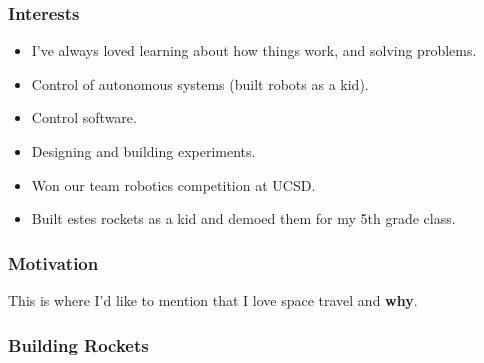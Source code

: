 \documentclass[aspectratio=169]{beamer}
\begin{document}
\begin{frame}
  \frametitle{Interests} 
  \begin{itemize}
  \item I've always loved learning about how things work,
    and solving problems.
  \item Control of autonomous systems (built robots as a kid).
  \item Control software.
  \item Designing and building experiments.
  \item Won our team robotics competition at UCSD.
  \item Built estes rockets as a kid and demoed them for my 5th grade class.
  \end{itemize}
\end{frame}

\begin{frame}
  \frametitle{Motivation}
  This is where I'd like to mention that I love
  space travel and \textbf{why}.
  
  
\end{frame}

\begin{frame}
  \frametitle{Building Rockets}
  

\end{frame}


\end{document}
